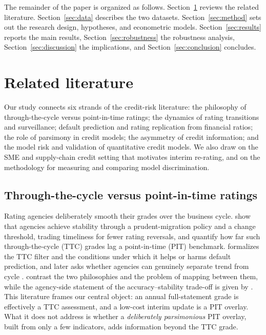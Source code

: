 \documentclass[pdflatex,sn-mathphys-ay]{sn-jnl}
\begin{document}
The remainder of the paper is organized as follows. Section~\ref{sec:literature} reviews the related
literature. Section~\ref{sec:data} describes the two datasets. Section~\ref{sec:method} sets out the
research design, hypotheses, and econometric models. Section~\ref{sec:results} reports the main
results, Section~\ref{sec:robustness} the robustness analysis, Section~\ref{sec:discussion} the
implications, and Section~\ref{sec:conclusion} concludes.

\section{Related literature}\label{sec:literature}

Our study connects six strands of the credit-risk literature: the philosophy of
through-the-cycle versus point-in-time ratings; the dynamics of rating transitions and
surveillance; default prediction and rating replication from financial ratios; the role of
parsimony in credit models; the asymmetry of credit information; and the model risk and
validation of quantitative credit models. We also draw on the SME and supply-chain credit
setting that motivates interim re-rating, and on the methodology for measuring and comparing
model discrimination.

\subsection{Through-the-cycle versus point-in-time ratings}
Rating agencies deliberately smooth their grades over the business cycle. \citet{altman2004stability}
show that agencies achieve stability through a prudent-migration policy and a change
threshold, trading timeliness for fewer rating reversals, and \citet{altman2006pit} quantify
how far such through-the-cycle (TTC) grades lag a point-in-time (PIT) benchmark.
\citet{loffler2004anatomy} formalizes the TTC filter and the conditions under which it helps or
harms default prediction, and later asks whether agencies can genuinely separate trend from
cycle \citep{loffler2013lookthrough}. \citet{topp2010ttcpit} contrast the two philosophies and the
problem of mapping between them, while the agency-side statement of the accuracy--stability
trade-off is given by \citet{cantor2006tradeoff}. This literature frames our central object: an
annual full-statement grade is effectively a TTC assessment, and a low-cost interim update is a
PIT overlay. What it does not address is whether a \emph{deliberately parsimonious} PIT overlay,
built from only a few indicators, adds information beyond the TTC grade.
\end{document}
